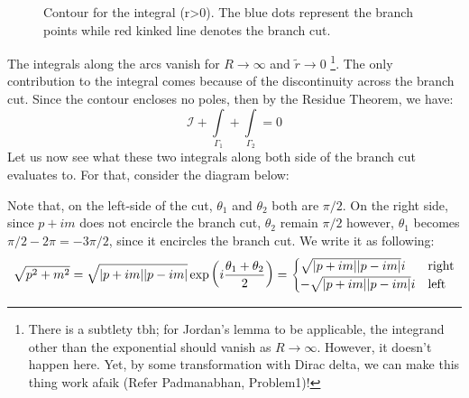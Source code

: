 \begin{figure}[H]
    \centering 
    
    \caption{Contour for the integral (r>0). The blue dots represent the branch points while red kinked line denotes the branch cut. }
\end{figure}
\noindent
The integrals along the arcs vanish for $R\rightarrow \infty$ and $\tilde{r}\to 0$ \footnote{There is a subtlety tbh; for Jordan's lemma to be applicable, the integrand other than the exponential should vanish as $R\to \infty$. However, it doesn't happen here. Yet, by some transformation with Dirac delta, we can make this thing work afaik (Refer Padmanabhan, Problem1)!}. The only contribution to the integral comes because of the discontinuity across the branch cut. Since the contour encloses no poles, then by the Residue Theorem, we have:
$$\mathcal{I} + \int\limits_{\Gamma_1} + \int\limits_{\Gamma_2} = 0 $$
Let us now see what these two integrals along both side of the branch cut evaluates to. For that, consider the diagram below:
\begin{figure}[H]
    \centering
    
\end{figure}
\noindent
Note that, on the left-side of the cut, $\theta_1$ and $\theta_2$ both are $\pi/2$. On the right side, since $p+im$ does not encircle the branch cut, $\theta_2$ remain $\pi/2$ however, $\theta_1$ becomes $\pi/2 - 2\pi = -3\pi/2$, since it encircles the branch cut. We write it as following:
$$\sqrt{p^2+m^2} = \sqrt{|p+im||p-im|} \exp\qty(i\frac{\theta_1+\theta_2}{2})=\begin{cases}
   \sqrt{|p+im||p-im|} i & \mathrm{right}\\
    -\sqrt{|p+im||p-im|}i &\mathrm{left}
\end{cases}$$

